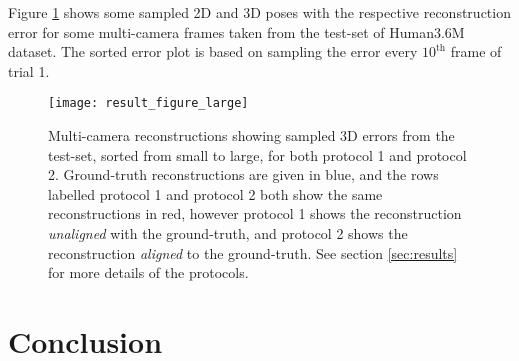 \documentclass[10pt,twocolumn,letterpaper]{article}
\renewcommand*{\arraystretch}{.6}
\begin{document}
\begin{table}[tb]
\renewcommand{\arraystretch}{1.1}
 \caption {Quantitative evaluation performed on existing approaches,
  demonstrating the performance gain when various models are trained with
  our additional data.  \label{tab:training_differences}}
\end{table}

Figure \ref{fig:results} shows some sampled 2D and 3D poses with the respective
reconstruction error for some multi-camera frames taken from the test-set of
Human3.6M dataset. The sorted error plot is based on sampling
the error every $10^\text{th}$ frame of trial 1.


\begin{figure}[tb]
 \hspace{-3mm}\texttt{[image: result\_figure\_large]}
 \caption{Multi-camera reconstructions showing sampled 3D errors from the test-set,
   sorted from small to large, for both protocol 1 and protocol
   2. Ground-truth reconstructions are given in blue, and the rows labelled
   protocol 1 and protocol 2 both show the same reconstructions in red, however
   protocol 1 shows the reconstruction {\em unaligned} with the ground-truth,
   and protocol 2 shows the reconstruction {\em aligned} to the
   ground-truth.  \label{fig:results} See section \ref{sec:results} for more
   details of the protocols.}
\end{figure}

\section{Conclusion}
\end{document}
